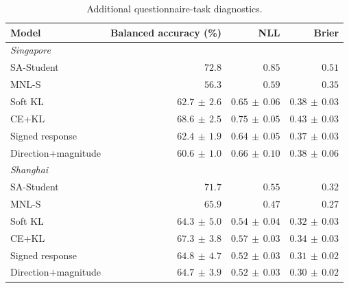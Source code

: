 \begin{table}[pos=htbp]
\centering\small
\caption{Additional questionnaire-task diagnostics.}
\label{tab:human_primary}
\setlength{\tabcolsep}{4pt}
\renewcommand{\arraystretch}{1.12}
\begin{tabular*}{\linewidth}{@{\extracolsep{\fill}}lrrr@{}}
\toprule
Model & Balanced accuracy (\%) & NLL & Brier \\
\midrule
\multicolumn{4}{l}{\textit{Singapore}} \\
SA-Student & $72.8$ & $0.85$ & $0.51$ \\
MNL-S & $56.3$ & $0.59$ & $0.35$ \\
Soft KL & $62.7\,\pm\,2.6$ & $0.65\,\pm\,0.06$ & $0.38\,\pm\,0.03$ \\
CE+KL & $68.6\,\pm\,2.5$ & $0.75\,\pm\,0.05$ & $0.43\,\pm\,0.03$ \\
Signed response & $62.4\,\pm\,1.9$ & $0.64\,\pm\,0.05$ & $0.37\,\pm\,0.03$ \\
Direction+magnitude & $60.6\,\pm\,1.0$ & $0.66\,\pm\,0.10$ & $0.38\,\pm\,0.06$ \\
\multicolumn{4}{l}{\textit{Shanghai}} \\
SA-Student & $71.7$ & $0.55$ & $0.32$ \\
MNL-S & $65.9$ & $0.47$ & $0.27$ \\
Soft KL & $64.3\,\pm\,5.0$ & $0.54\,\pm\,0.04$ & $0.32\,\pm\,0.03$ \\
CE+KL & $67.3\,\pm\,3.8$ & $0.57\,\pm\,0.03$ & $0.34\,\pm\,0.03$ \\
Signed response & $64.8\,\pm\,4.7$ & $0.52\,\pm\,0.03$ & $0.31\,\pm\,0.02$ \\
Direction+magnitude & $64.7\,\pm\,3.9$ & $0.52\,\pm\,0.03$ & $0.30\,\pm\,0.02$ \\
\bottomrule
\end{tabular*}
\par{}
\end{table}
